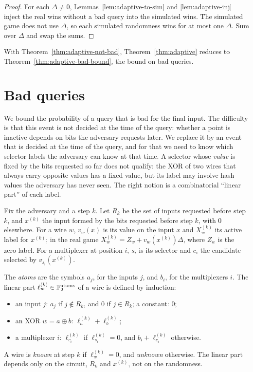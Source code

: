 \begin{proof}
  \leanok
  For each $\Delta \neq 0$, Lemmas~\ref{lem:adaptive-to-sim} and \ref{lem:adaptive-inj} inject the
  real wins without a bad query into the simulated wins. The simulated game does not use $\Delta$,
  so each simulated randomness wins for at most one $\Delta$. Sum over $\Delta$ and swap the sums.
\end{proof}

With Theorem~\ref{thm:adaptive-not-bad}, Theorem~\ref{thm:adaptive} reduces to
Theorem~\ref{thm:adaptive-bad-bound}, the bound on bad queries.

\section{Bad queries}
\label{sec:adaptive-bad}

We bound the probability of a query that is bad for the final input. The difficulty is that this
event is not decided at the time of the query: whether a point is inactive depends on bits the
adversary requests later. We replace it by an event that is decided at the time of the query, and
for that we need to know which selector labels the adversary can know at that time. A selector
whose \emph{value} is fixed by the bits requested so far does not qualify: the XOR of two wires
that always carry opposite values has a fixed value, but its label may involve hash values the
adversary has never seen. The right notion is a combinatorial ``linear part'' of each label.

Fix the adversary and a step $k$. Let $R_k$ be the set of inputs requested before step $k$, and
$x^{(k)}$ the input formed by the bits requested before step $k$, with $0$ elsewhere. For a wire
$w$, $v_w(x)$ is its value on the input $x$ and $X^{(k)}_w$ its active label for $x^{(k)}$; in the
real game $X^{(k)}_w = Z_w + v_w(x^{(k)}) \Delta$, where $Z_w$ is the zero-label. For a
multiplexer at position $i$, $s_i$ is its selector and $c_i$ the candidate selected by
$v_{s_i}(x^{(k)})$.

\begin{definition}
  \label{def:lin}
  \leanok
  The \emph{atoms} are the symbols $a_j$, for the inputs $j$, and $b_i$, for the multiplexers $i$.
  The linear part $\ell^{(k)}_w \in \mathbb{F}_2^{\mathrm{atoms}}$ of a wire is defined by induction:
  \begin{itemize}
    \item an input $j$: $a_j$ if $j \notin R_k$, and $0$ if $j \in R_k$; a constant: $0$;
    \item an XOR $w = a \oplus b$: $\ell^{(k)}_a + \ell^{(k)}_b$;
    \item a multiplexer $i$: $\ell^{(k)}_{c_i}$ if $\ell^{(k)}_{s_i} = 0$, and
    $b_i + \ell^{(k)}_{c_i}$ otherwise.
  \end{itemize}
  A wire is \emph{known} at step $k$ if $\ell^{(k)}_w = 0$, and \emph{unknown} otherwise. The
  linear part depends only on the circuit, $R_k$ and $x^{(k)}$, not on the randomness.
\end{definition}

